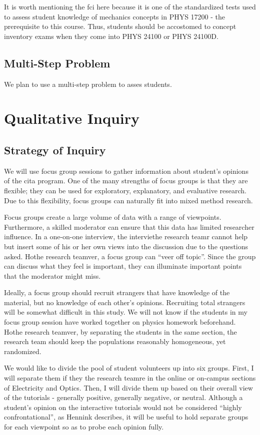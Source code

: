 It is worth mentioning the \gls{fci} here because it is one of the standardized tests used to assess student knowledge of mechanics concepts in PHYS 17200 - the prerequisite to this course. Thus, students should be accostomed to concept inventory exams when they come into PHYS 24100 or PHYS 24100D.

\subsection{Multi-Step Problem}

We plan to use a multi-step problem to asses students\cite{sherwood2005, chabay2014}.

\section{Qualitative Inquiry}

\subsection{Strategy of Inquiry}

We will use focus group sessions to gather information about student's opinions of the \gls{cita} program. One of the many strengths of focus groups is that they are flexible; they can be used for exploratory, explanatory, and evaluative research. Due to this flexibility, focus groups can naturally fit into mixed method research.

Focus groups create a large volume of data with a range of viewpoints. Furthermore, a skilled moderator can ensure that this data has limited researcher influence. In a one-on-one interview, the interviethe research teamr cannot help but insert some of his or her own views into the discussion due to the questions asked. Hothe research teamver, a focus group can “veer off topic”. Since the group can discuss what they feel is important, they can illuminate important points that the moderator might miss.

Ideally, a focus group should recruit strangers that have knowledge of the material, but no knowledge of each other's opinions. Recruiting total strangers will be somewhat difficult in this study. We will not know if the students in my focus group session have worked together on physics homework beforehand. Hothe research teamver, by separating the students in the same section, the research team should keep the populations reasonably homogeneous, yet randomized.

We would like to divide the pool of student volunteers up into six groups. First, I will separate them if they the research teamre in the online or on-campus sections of Electricity and Optics. Then, I will divide them up based on their overall view of the tutorials - generally positive, generally negative, or neutral. Although a student’s opinion on the interactive tutorials would not be considered “highly confrontational”, as Hennink describes, it will be useful to hold separate groups for each viewpoint so as to probe each opinion fully.

